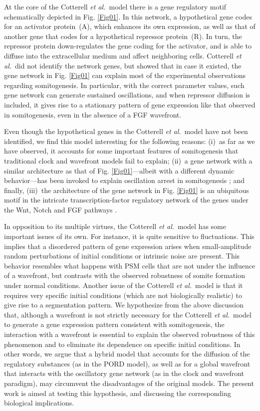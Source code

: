 \documentclass[%
 preprint,
 amsmath,amssymb,
 aps,
]{revtex4-2}
\begin{document}
	At the core of the Cotterell {\em et al.}~model there is a gene regulatory
	motif schematically depicted in Fig. \ref{Fig01}. In this network, a
	hypothetical gene codes for an activator protein~(A), which enhances its own
	expression, as well as that of another gene that codes for a hypothetical
	repressor protein~(R). In turn, the repressor protein down-regulates the gene
	coding for the activator, and is able to diffuse into the extracellular medium
	and affect neighboring cells. Cotterell {\em et al.}~did not identify the
	network genes, but showed that in case it existed, the gene network in Fig.
	\ref{Fig01} can explain most of the experimental observations regarding
	somitogenesis. In particular, with the correct parameter values, such gene
	network can generate sustained oscillations, and when repressor diffusion is
	included, it gives rise to a stationary pattern of gene expression like that
	observed in somitogenesis, even in the absence of a FGF wavefront.
	
	Even though the hypothetical genes in the Cotterell {\em et al.}~model have
	not been identified, we find this model interesting for the following reasons:
	(i)~as far as we have observed, it accounts for some important features of
	somitogenesis that traditional clock and wavefront models fail to explain; (ii)~a gene network with a similar architecture as that of Fig. \ref{Fig01}---albeit
	with a different dynamic behavior---has been invoked to explain oscillation
	arrest in somitogenesis \citep{Santillan2008, Zavala2012}; and finally, (iii)~the architecture of the gene network in Fig. \ref{Fig01} is an ubiquitous motif
	in the intricate transcription-factor regulatory network of the genes under the
	Wnt, Notch and FGF pathways \citep{Gibb2010, Zavala2012}.
	
	In opposition to its multiple virtues, the Cotterell {\em et al.}~model 
	has some important issues of its own. For instance, it is
	quite sensitive to fluctuations. This implies that a disordered pattern of gene
	expression arises when small-amplitude random perturbations of initial conditions 
	or intrinsic noise are present. This behavior resembles what happens with PSM 
	cells that are not under the influence of a wavefront, but contrasts with the 
	observed robustness of somite formation under normal conditions. Another issue 
	of the Cotterell {\em et al.}~model is that it requires very specific initial
	conditions (which are not biologically realistic) 
	to give rise to a segmentation pattern. We hypothesize from the
	above discussion that, although a wavefront is not strictly necessary for the
	Cotterell {\em et al.}~model to generate a gene expression pattern
	consistent with somitogenesis, the interaction with a wavefront is essential to
	explain the observed robustness of this phenomenon and to eliminate its dependence
	on specific initial conditions. In other words, we argue 
	that a hybrid model that accounts for the diffusion of the regulatory substances
	(as in the PORD model), as well as for a global wavefront that interacts
	with the oscillatory gene network (as in the clock and wavefront paradigm), 
	may circumvent the disadvantages of the original models. The present work is aimed at
	testing this hypothesis, and discussing the corresponding biological
	implications.
	
\end{document}
